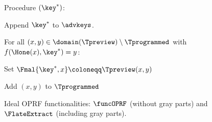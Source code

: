 \begin{figure}
{{{        Procedure \Correlate$(\key^*)$: 
        \begin{compactitem} 
         \item Append $\key^*$ to $\advkeys$.
         \item For all $(x,y)\in \domain(\Tpreview)\setminus\Tprogrammed$ with $f(\Hone(x),\key^*)=y$:
         \begin{compactitem} 
          \item Set $\Fmal{\key^*, x} \coloneqq \Tpreview(x,y)$
          \item Add $(x,y)$ to $\Tprogrammed$
         \end{compactitem}
        \end{compactitem}
        }
    }
    }
    \caption{Ideal OPRF functionalities: $\funcOPRF$ \cite{ESP:JKKX16} (without gray parts) and $\FlateExtract$ (including gray parts).}
    \label{fig:lateExtractionOPRF}
\end{figure}


